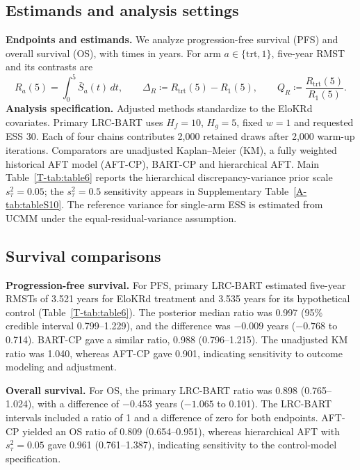 \documentclass[11pt]{article}
\newcommand{\lrc}{LRC-BART} %
\theoremstyle{remark}\newtheorem{remark}{Remark}[section]
\providecommand{\DIFdeltex}[1]{{\protect\color{red} \scriptsize #1}} %
\providecommand{\DIFdelbegin}{} %
\providecommand{\DIFdelend}{} %
\providecommand{\DIFdel}[1]{\texorpdfstring{\DIFdeltex{#1}}{}} %
\begin{document}
\subsection{Estimands and analysis settings}
\DIFdelbegin %
\DIFdel{\textbf{Endpoints and estimands.}
}\DIFdelend We analyze progression-free survival (PFS) and overall survival (OS), with times in years. For arm $a\in\{\mathrm{trt},1\}$, five-year RMST and its contrasts are
\begin{equation}\label{eq:rmst}
R_a(5)=\int_0^5\bar S_a(t)\,dt,\qquad
\Delta_R\coloneqq R_{\mathrm{trt}}(5)-R_1(5),\qquad Q_R\coloneqq \frac{R_{\mathrm{trt}}(5)}{R_1(5)}.
\end{equation}
\DIFdelbegin %
\DIFdel{\textbf{Analysis specification.}
}\DIFdelend Adjusted methods standardize to the EloKRd covariates. Primary \lrc{} uses $H_f=10$, $H_g=5$, fixed $w=1$ and requested ESS 30. Each of four chains contributes 2,000 retained draws after 2,000 warm-up iterations. Comparators are unadjusted Kaplan--Meier (KM), a fully weighted historical AFT model (AFT-CP), BART-CP and hierarchical AFT. Main Table~\ref{T-tab:table6} reports the hierarchical discrepancy-variance prior scale $s_\tau^2=0.05$; the $s_\tau^2=0.5$ sensitivity appears in Supplementary Table~\ref{A-tab:tableS10}. The reference variance for single-arm ESS is estimated from UCMM under the equal-residual-variance assumption.

\subsection{Survival comparisons}
\DIFdelbegin %
\DIFdel{\textbf{Progression-free survival.}
}\DIFdelend For PFS, primary \lrc{} estimated five-year RMSTs of 3.521 years for EloKRd treatment and 3.535 years for its hypothetical control (Table~\ref{T-tab:table6}). The posterior median ratio was 0.997 (95\% credible interval 0.799--1.229), and the difference was $-0.009$ years ($-0.768$ to 0.714). BART-CP gave a similar ratio, 0.988 (0.796--1.215). The unadjusted KM ratio was 1.040, whereas AFT-CP gave 0.901, indicating sensitivity to outcome modeling and adjustment.

\DIFdelbegin %
\DIFdel{\textbf{Overall survival.}
}\DIFdelend For OS, the primary \lrc{} ratio was 0.898 (0.765--1.024), with a difference of $-0.453$ years ($-1.065$ to 0.101). The \lrc{} intervals included a ratio of 1 and a difference of zero for both endpoints. AFT-CP yielded an OS ratio of 0.809 (0.654--0.951), whereas hierarchical AFT with $s_\tau^2=0.05$ gave 0.961 (0.761--1.387), indicating sensitivity to the control-model specification.
\end{document}
